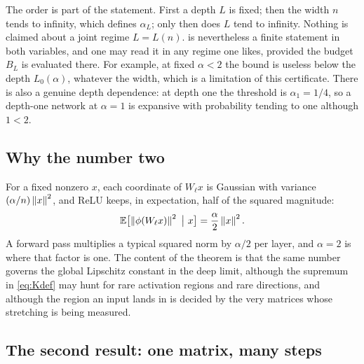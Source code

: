 The order is part of the statement. First a depth $L$ is fixed; then the width $n$ tends to infinity, which defines $\alpha_L$; only then does $L$ tend to infinity. Nothing is claimed about a joint regime $L=L(n)$.  is nevertheless a finite statement in both variables, and one may read it in any regime one likes, provided the budget $B_L$ is evaluated there. For example, at fixed $\alpha<2$ the bound is useless below the depth $L_0(\alpha)$, whatever the width, which is a limitation of this certificate. There is also a genuine depth dependence: at depth one the threshold is $\alpha_1=1/4$, so a depth-one network at $\alpha=1$ is expansive with probability tending to one although $1<2$.

\subsection{Why the number two}

For a fixed nonzero $x$, each coordinate of $W_\ell x$ is Gaussian with variance $(\alpha/n)\left\lVert x\right\rVert^2$, and ReLU keeps, in expectation, half of the squared magnitude:
\[
\E\bigl[\norm{\phi(W_\ell x)}^2\ \big|\ x\bigr]=\frac{\alpha}{2}\norm x^2.
\]
A forward pass multiplies a typical squared norm by $\alpha/2$ per layer, and $\alpha=2$ is where that factor is one. The content of the theorem is that the same number governs the global Lipschitz constant in the deep limit, although the supremum in \cref{eq:Kdef} may hunt for rare activation regions and rare directions, and although the region an input lands in is decided by the very matrices whose stretching is being measured.

\subsection{The second result: one matrix, many steps}

